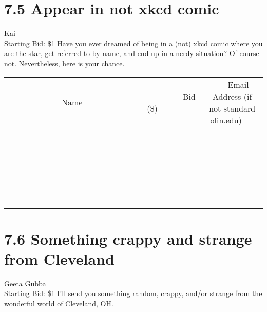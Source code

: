 \documentclass[11pt]{article}
\begin{document}
\section*{7.5 Appear in not xkcd comic}
Kai
\\
Starting Bid: \$1
\newline
Have you ever dreamed of being in a (not) xkcd comic where you are the star, get referred to by name, and end up in a nerdy situation? Of course not. Nevertheless, here is your chance.
\\[6ex]
\begin{tabular}{c c c}
~~~~~~~~~~~~~Name~~~~~~~~~~~~~ & ~~~~~~~~~Bid (\$)~~~~~~~~~  & ~~~Email Address (if not standard olin.edu)~~~\\
 & & \\
\hline
 & & \\
\hline
 & & \\
\hline
 & & \\
\hline
 & & \\
\hline
 & & \\
\hline
 & & \\
\hline
 & & \\
\hline
 & & \\
\hline
 & & \\
\hline
 & & \\
\hline
 & & \\
\hline
 & & \\
\hline
 & & \\
\hline
 & & \\
\hline
 & & \\
\hline
 & & \\
\hline
 & & \\
\hline
 & & \\
\hline
 & & \\
\hline
 & & \\
\hline
 & & \\
\hline
 & & \\
\hline
 & & \\
\hline
 & & \\
\hline
 & & \\
\hline
\end{tabular}
\newpage
\section*{7.6 Something crappy and strange from Cleveland}
Geeta Gubba
\\
Starting Bid: \$1
\newline
I'll send you something random, crappy, and/or strange from the wonderful world of Cleveland, OH. 
\end{document}
